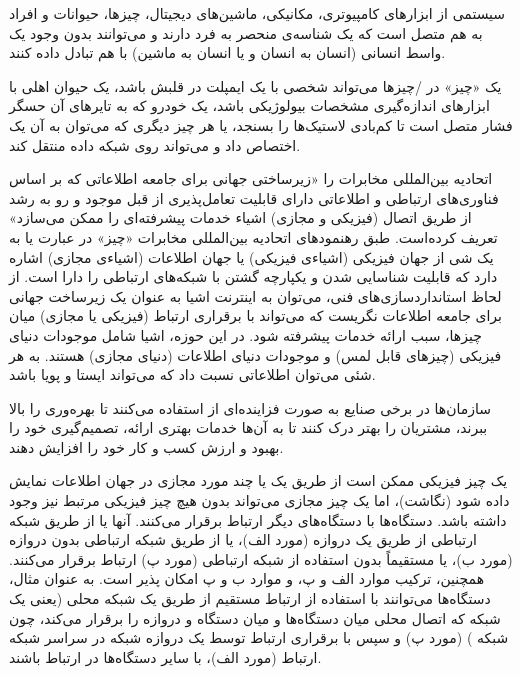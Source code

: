 

 سیستمی از ابزارهای کامپیوتری، مکانیکی، ماشین‌های دیجیتال، چیزها، حیوانات و افراد به هم متصل است که یک شناسه‌ی منحصر به فرد دارند و می‌توانند بدون وجود یک واسط انسانی (انسان به انسان و یا انسان به ماشین) با هم تبادل داده کنند.

یک «چیز» در /چیزها می‌تواند شخصی با یک ایمپلت در قلبش باشد، یک حیوان اهلی با ابزارهای اندازه‌گیری مشخصات بیولوژیکی باشد، یک خودرو که به تایرهای آن حسگر فشار متصل است تا کم‌بادی لاستیک‌ها را بسنجد، یا هر چیز دیگری که می‌توان به آن یک  اختصاص داد و می‌تواند روی شبکه داده منتقل کند.

اتحادیه بین‌المللی مخابرات  را «زیرساختی جهانی برای جامعه اطلاعاتی که بر اساس فناوری‌های ارتباطی و اطلاعاتی دارای قابلیت تعامل‌پذیری از قبل موجود و رو به رشد از طریق اتصال (فیزیکی و مجازی) اشیاء خدمات پیشرفته‌ای را ممکن می‌سازد» تعریف کرده‌است. طبق رهنمودهای اتحادیه بین‌المللی مخابرات «چیز» در عبارت  یا به یک شی از جهان فیزیکی (اشیاءی فیزیکی) یا جهان اطلاعات (اشیاءی مجازی) اشاره دارد که قابلیت شناسایی شدن و یکپارچه گشتن با شبکه‌های ارتباطی را دارا است.
از لحاظ استانداردسازی‌های فنی، می‌توان به اینترنت اشیا به عنوان یک زیرساخت جهانی برای جامعه اطلاعات نگریست که می‌تواند با برقراری ارتباط (فیزیکی یا مجازی) میان چیزها، سبب ارائه خدمات پیشرفته شود.
در این حوزه، اشیا شامل موجودات دنیای فیزیکی (چیزهای قابل لمس) و موجودات دنیای اطلاعات (دنیای مجازی) هستند. به هر شئی می‌توان اطلاعاتی نسبت داد که می‌تواند ایستا و پویا باشد.

سازمان‌ها در برخی صنایع به صورت فزاینده‌ای از  استفاده می‌کنند تا بهره‌وری را بالا ببرند، مشتریان را بهتر درک کنند تا به آن‌ها خدمات بهتری ارائه، تصمیم‌گیری خود را بهبود و ارزش کسب و کار خود را افزایش دهند.


یک چیز فیزیکی ممکن است از طریق یک یا چند مورد مجازی در جهان اطلاعات نمایش داده شود (نگاشت)، اما یک چیز مجازی می‌تواند بدون هیچ چیز فیزیکی مرتبط نیز وجود داشته باشد.
دستگاه‌ها با دستگاه‌های دیگر ارتباط برقرار می‌کنند. آنها یا از طریق شبکه ارتباطی از طریق یک دروازه (مورد الف)، یا از طریق شبکه ارتباطی بدون دروازه (مورد ب)، یا مستقیماً بدون استفاده از شبکه ارتباطی (مورد پ) ارتباط برقرار می‌کنند. همچنین، ترکیب موارد الف و پ، و موارد ب و پ امکان پذیر است. به عنوان مثال، دستگاه‌ها می‌توانند با استفاده از ارتباط مستقیم از طریق یک شبکه محلی (یعنی یک شبکه که اتصال محلی میان دستگاه‌ها و میان دستگاه و دروازه را برقرار می‌کند، چون شبکه ) (مورد پ) و سپس با برقراری ارتباط توسط یک دروازه شبکه در سراسر شبکه ارتباط (مورد الف)، با سایر دستگاه‌ها در ارتباط باشند.

